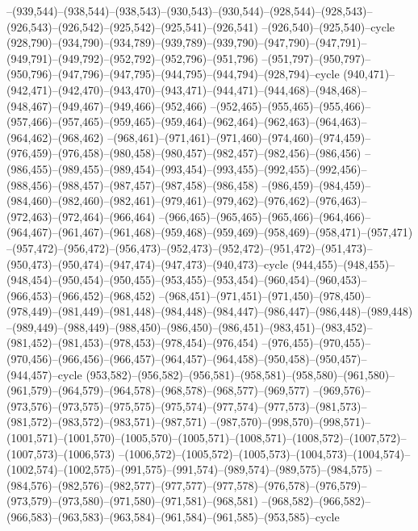 --(939,544)--(938,544)--(938,543)--(930,543)--(930,544)--(928,544)--(928,543)--(926,543)--(926,542)--(925,542)--(925,541)--(926,541)
--(926,540)--(925,540)--cycle
(928,790)--(934,790)--(934,789)--(939,789)--(939,790)--(947,790)--(947,791)--(949,791)--(949,792)--(952,792)--(952,796)--(951,796)
--(951,797)--(950,797)--(950,796)--(947,796)--(947,795)--(944,795)--(944,794)--(928,794)--cycle
(940,471)--(942,471)--(942,470)--(943,470)--(943,471)--(944,471)--(944,468)--(948,468)--(948,467)--(949,467)--(949,466)--(952,466)
--(952,465)--(955,465)--(955,466)--(957,466)--(957,465)--(959,465)--(959,464)--(962,464)--(962,463)--(964,463)--(964,462)--(968,462)
--(968,461)--(971,461)--(971,460)--(974,460)--(974,459)--(976,459)--(976,458)--(980,458)--(980,457)--(982,457)--(982,456)--(986,456)
--(986,455)--(989,455)--(989,454)--(993,454)--(993,455)--(992,455)--(992,456)--(988,456)--(988,457)--(987,457)--(987,458)--(986,458)
--(986,459)--(984,459)--(984,460)--(982,460)--(982,461)--(979,461)--(979,462)--(976,462)--(976,463)--(972,463)--(972,464)--(966,464)
--(966,465)--(965,465)--(965,466)--(964,466)--(964,467)--(961,467)--(961,468)--(959,468)--(959,469)--(958,469)--(958,471)--(957,471)
--(957,472)--(956,472)--(956,473)--(952,473)--(952,472)--(951,472)--(951,473)--(950,473)--(950,474)--(947,474)--(947,473)--(940,473)--cycle
(944,455)--(948,455)--(948,454)--(950,454)--(950,455)--(953,455)--(953,454)--(960,454)--(960,453)--(966,453)--(966,452)--(968,452)
--(968,451)--(971,451)--(971,450)--(978,450)--(978,449)--(981,449)--(981,448)--(984,448)--(984,447)--(986,447)--(986,448)--(989,448)
--(989,449)--(988,449)--(988,450)--(986,450)--(986,451)--(983,451)--(983,452)--(981,452)--(981,453)--(978,453)--(978,454)--(976,454)
--(976,455)--(970,455)--(970,456)--(966,456)--(966,457)--(964,457)--(964,458)--(950,458)--(950,457)--(944,457)--cycle
(953,582)--(956,582)--(956,581)--(958,581)--(958,580)--(961,580)--(961,579)--(964,579)--(964,578)--(968,578)--(968,577)--(969,577)
--(969,576)--(973,576)--(973,575)--(975,575)--(975,574)--(977,574)--(977,573)--(981,573)--(981,572)--(983,572)--(983,571)--(987,571)
--(987,570)--(998,570)--(998,571)--(1001,571)--(1001,570)--(1005,570)--(1005,571)--(1008,571)--(1008,572)--(1007,572)--(1007,573)--(1006,573)
--(1006,572)--(1005,572)--(1005,573)--(1004,573)--(1004,574)--(1002,574)--(1002,575)--(991,575)--(991,574)--(989,574)--(989,575)--(984,575)
--(984,576)--(982,576)--(982,577)--(977,577)--(977,578)--(976,578)--(976,579)--(973,579)--(973,580)--(971,580)--(971,581)--(968,581)
--(968,582)--(966,582)--(966,583)--(963,583)--(963,584)--(961,584)--(961,585)--(953,585)--cycle
